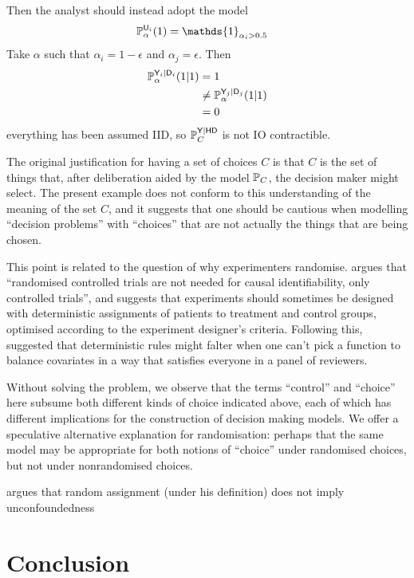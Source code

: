 Then the analyst should instead adopt the model
\begin{align}
    \prob{P}_\alpha^{\RV{U}_i}(1) &= \mathds{1}_{\alpha_i>0.5}
\end{align}
Take $\alpha$ such that $\alpha_i=1-\epsilon$ and $\alpha_j=\epsilon$. Then
\begin{align}
    \mathbb{P}_{\alpha}^{\mathsf{Y}_i|\mathsf{D}_i}(1|1) &= 1\\
    &\neq \mathbb{P}_\alpha^{\mathsf{Y}_j|\mathsf{D}_j}(1|1)\\
    &=0
\end{align}
everything has been assumed IID, so $\mathbb{P}_C^{\mathsf{Y}|\mathsf{HD}}$ is not IO contractible.

The original justification for having a set of choices $C$ is that $C$ is the set of things that, after deliberation aided by the model $\mathbb{P}_C$, the decision maker might select. The present example does not conform to this understanding of the meaning of the set $C$, and it suggests that one should be cautious when modelling ``decision problems'' with ``choices'' that are not actually the things that are being chosen.

This point is related to the question of why experimenters randomise. \citet{kasy_why_2016} argues that ``randomised controlled trials are not needed for causal identifiability, only controlled trials'', and suggests that experiments should sometimes be designed with deterministic assignments of patients to treatment and control groups, optimised according to the experiment designer's criteria. Following this, \citet{banerjee_theory_2020} suggested that deterministic rules might falter when one can't pick a function to balance covariates in a way that satisfies everyone in a panel of reviewers. 

Without solving the problem, we observe that the terms ``control'' and ``choice'' here subsume both different kinds of choice indicated above, each of which has different implications for the construction of decision making models. We offer a speculative alternative explanation for randomisation: perhaps that the same model may be appropriate for both notions of ``choice'' under randomised choices, but not under nonrandomised choices.


\citet{savje_randomization_2021} argues that random assignment (under his definition) does not imply unconfoundedness

\section{Conclusion}

